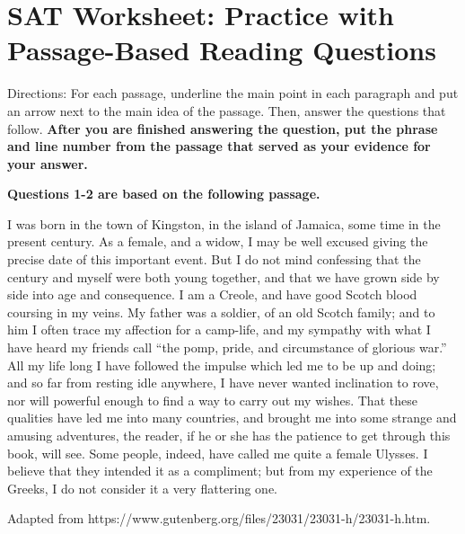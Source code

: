 \section{SAT Worksheet: Practice with Passage-Based Reading Questions}

Directions: For each passage, underline the main point in each paragraph and put an arrow next
to the main idea of the passage. Then, answer the questions that follow. \textbf{After you are finished
answering the question, put the phrase and line number from the passage that served
as your evidence for your answer.}

\textbf{Questions 1-2 are based on the following passage.}

\begin{linenumbers*}
\modulolinenumbers[5] 
\indent I was born in the town of Kingston, in the island of Jamaica, some time in the present century. As a female, and a widow, I may be well excused giving the precise date of this important event. But I do not mind confessing that the century and myself were both young together, and that we have grown side by side into age and consequence. I am a Creole, and have good Scotch blood coursing in my veins. My father was a soldier, of an old Scotch family; and to him I often trace my affection for a camp-life, and my sympathy with what I have heard my friends call ``the pomp, pride, and circumstance of glorious war.'' All my life long I have followed the impulse which led me to be up and doing; and so far from resting idle anywhere, I have never wanted inclination to rove, nor will powerful enough to find a way to carry out my wishes. That these qualities have led me into many countries, and brought me into some strange and amusing adventures, the reader, if he or she has the patience to get through this book, will see. Some people, indeed, have called me quite a female Ulysses. I believe that they intended it as a compliment; but from my experience of the Greeks, I do not consider it a very flattering one.
\end{linenumbers*}

Adapted from https://www.gutenberg.org/files/23031/23031-h/23031-h.htm. 

